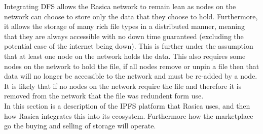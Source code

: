 Integrating DFS allows the Rasica network to remain lean as nodes on the network can choose to store only the data that they choose to hold. Furthermore, it allows the storage of many rich file types in a distributed manner, meaning that they are always accessible with no down time guaranteed (excluding the potential case of the internet being down). This is further under the assumption that at least one node on the network holds the data. This also requires some nodes on the network to hold the file, if all nodes remove or unpin a file then that data will no longer be accessible to the network and must be re-added by a node. It is likely that if no nodes on the network require the file and therefore it is removed from the network that the file was redundent form use.\\ %



In this section is a description of the IPFS platform that Rasica uses, and then how Rasica integrates this into its ecosystem. Furthermore how the marketplace go the buying and selling of storage will operate. 
